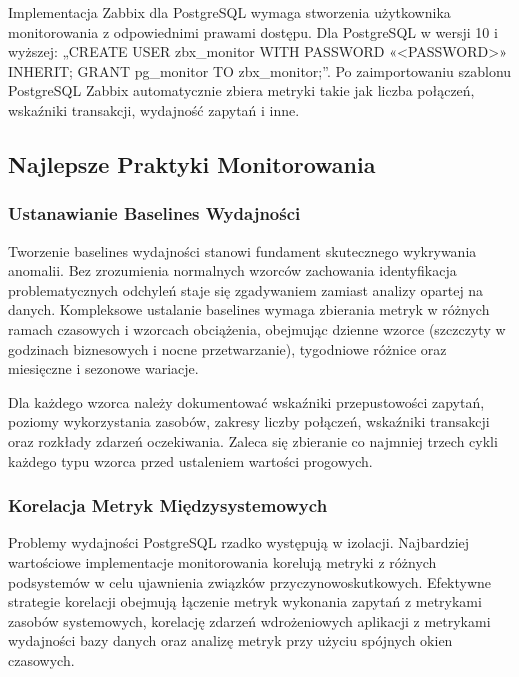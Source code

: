 \documentclass[letterpaper,10pt,polish]{sphinxmanual}
\begin{document}
\sphinxAtStartPar
Implementacja Zabbix dla PostgreSQL wymaga stworzenia użytkownika monitorowania z odpowiednimi prawami dostępu. Dla PostgreSQL w wersji 10 i wyższej: „CREATE USER zbx\_monitor WITH PASSWORD «\textless{}PASSWORD\textgreater{}» INHERIT; GRANT pg\_monitor TO zbx\_monitor;”. Po zaimportowaniu szablonu PostgreSQL Zabbix automatycznie zbiera metryki takie jak liczba połączeń, wskaźniki transakcji, wydajność zapytań i inne.


\subsection{Najlepsze Praktyki Monitorowania}
\label{\detokenize{rozdzial2/repo-wspolne/index:najlepsze-praktyki-monitorowania}}

\subsubsection{Ustanawianie Baselines Wydajności}
\label{\detokenize{rozdzial2/repo-wspolne/index:ustanawianie-baselines-wydajnosci}}
\sphinxAtStartPar
Tworzenie baselines wydajności stanowi fundament skutecznego wykrywania anomalii. Bez zrozumienia normalnych wzorców zachowania identyfikacja problematycznych odchyleń staje się zgadywaniem zamiast analizy opartej na danych. Kompleksowe ustalanie baselines wymaga zbierania metryk w różnych ramach czasowych i wzorcach obciążenia, obejmując dzienne wzorce (szczczyty w godzinach biznesowych i nocne przetwarzanie), tygodniowe różnice oraz miesięczne i sezonowe wariacje.

\sphinxAtStartPar
Dla każdego wzorca należy dokumentować wskaźniki przepustowości zapytań, poziomy wykorzystania zasobów, zakresy liczby połączeń, wskaźniki transakcji oraz rozkłady zdarzeń oczekiwania. Zaleca się zbieranie co najmniej trzech cykli każdego typu wzorca przed ustaleniem wartości progowych.


\subsubsection{Korelacja Metryk Międzysystemowych}
\label{\detokenize{rozdzial2/repo-wspolne/index:korelacja-metryk-miedzysystemowych}}
\sphinxAtStartPar
Problemy wydajności PostgreSQL rzadko występują w izolacji. Najbardziej wartościowe implementacje monitorowania korelują metryki z różnych podsystemów w celu ujawnienia związków przyczynowo\sphinxhyphen{}skutkowych. Efektywne strategie korelacji obejmują łączenie metryk wykonania zapytań z metrykami zasobów systemowych, korelację zdarzeń wdrożeniowych aplikacji z metrykami wydajności bazy danych oraz analizę metryk przy użyciu spójnych okien czasowych.
\end{document}
